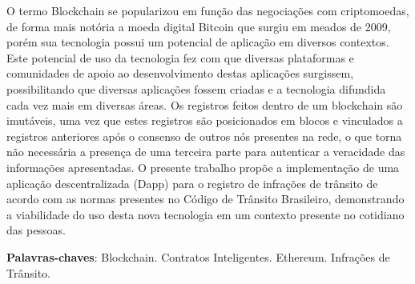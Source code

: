 \begin{resumo}
O termo Blockchain se popularizou em função das negociações com criptomoedas, de forma mais notória a moeda digital Bitcoin que surgiu em meados de 2009, porém sua tecnologia possui um potencial de aplicação em diversos contextos. Este potencial de uso da tecnologia fez com que diversas plataformas e comunidades de apoio ao desenvolvimento destas aplicações surgissem, possibilitando que diversas aplicações fossem criadas e a tecnologia difundida cada vez mais em diversas áreas. Os registros feitos dentro de um blockchain são imutáveis, uma vez que estes registros são posicionados em blocos e vinculados a registros anteriores após o consenso de outros nós presentes na rede, o que torna não necessária a presença de uma terceira parte para autenticar a veracidade das informações apresentadas. O presente trabalho propõe a implementação de uma aplicação descentralizada (Dapp) para o registro de infrações de trânsito de acordo com as normas presentes no Código de Trânsito Brasileiro, demonstrando a viabilidade do uso desta nova tecnologia em um contexto presente no cotidiano das pessoas.
 \vspace{\onelineskip}
    
 \noindent
 \textbf{Palavras-chaves}: Blockchain. Contratos Inteligentes. Ethereum. Infrações de Trânsito.
\end{resumo}
